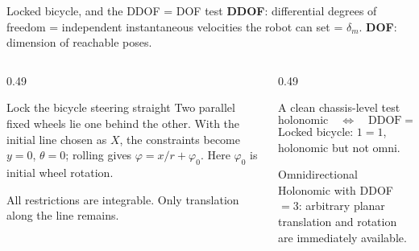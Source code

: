 \documentclass[aspectratio=169]{beamer}
\begin{document}
\begin{frame}[t]{Locked bicycle, and the DDOF = DOF test}
\small
\setlength{\abovedisplayskip}{1mm}\setlength{\belowdisplayskip}{1mm}
\setlength{\abovedisplayshortskip}{0pt}\setlength{\belowdisplayshortskip}{0pt}
\textbf{DDOF}: differential degrees of freedom = independent instantaneous velocities the robot can set = $\delta_m$. \textbf{DOF}: dimension of reachable poses.\par\vspace{2mm}\begin{columns}[T,onlytextwidth]\begin{column}{0.49\textwidth}
\begin{block}{Lock the bicycle steering straight}
Two parallel fixed wheels lie one behind the other. With the initial line chosen as $X$, the constraints become $y=0$, $\theta=0$; rolling gives $\varphi=x/r+\varphi_0$. Here $\varphi_0$ is initial wheel rotation.
\end{block}\vspace{2mm}
All restrictions are integrable. Only translation along the line remains.\end{column}\begin{column}{0.49\textwidth}
\begin{block}{A clean chassis-level test}
\[\text{holonomic}\quad\Longleftrightarrow\quad\mathrm{DDOF}=\mathrm{DOF}.\] Locked bicycle: $1=1$, holonomic but not omni.
\end{block}\vspace{2mm}
\begin{block}{Omnidirectional}
Holonomic with DDOF $=3$: arbitrary planar translation and rotation are immediately available.
\end{block}\vspace{2mm}
\end{column}\end{columns}
\end{frame}
\end{document}
